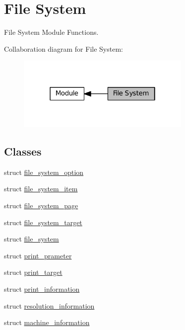 \hypertarget{group__MODULE__FILE__SYSTEM}{}\section{File System}
\label{group__MODULE__FILE__SYSTEM}


File System Module Functions.  


Collaboration diagram for File System\+:\nopagebreak
\begin{figure}[H]
\begin{center}
\leavevmode
\includegraphics[width=238pt]{group__MODULE__FILE__SYSTEM}
\end{center}
\end{figure}
\subsection*{Classes}
\begin{DoxyCompactItemize}
\item 
struct \hyperlink{structfile__system__option}{file\+\_\+system\+\_\+option}
\item 
struct \hyperlink{structfile__system__item}{file\+\_\+system\+\_\+item}
\item 
struct \hyperlink{structfile__system__page}{file\+\_\+system\+\_\+page}
\item 
struct \hyperlink{structfile__system__target}{file\+\_\+system\+\_\+target}
\item 
struct \hyperlink{structfile__system}{file\+\_\+system}
\item 
struct \hyperlink{structprint__prameter}{print\+\_\+prameter}
\item 
struct \hyperlink{structprint__target}{print\+\_\+target}
\item 
struct \hyperlink{structprint__information}{print\+\_\+information}
\item 
struct \hyperlink{structresolution__information}{resolution\+\_\+information}
\item 
struct \hyperlink{structmachine__information}{machine\+\_\+information}
\end{DoxyCompactItemize}
